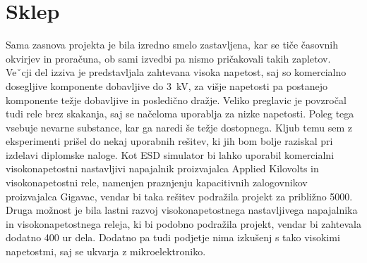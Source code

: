 \documentclass[a4paper,twoside,openright,12pt,Slovene]{book}
\begin{document}
\chapter{Sklep} \label{Sklep}

Sama zasnova projekta je bila izredno smelo zastavljena, kar se tiče časovnih okvirjev in proračuna, ob sami izvedbi pa nismo pričakovali takih zapletov.
~\\Veˇcji del izziva je predstavljala zahtevana visoka napetost, saj so komercialno
dosegljive komponente dobavljive do \SI{3}{\kilo\volt}, za višje napetosti pa postanejo komponente težje dobavljive in posledično dražje. Veliko preglavic je povzročal tudi rele brez skakanja, saj se načeloma uporablja za nizke napetosti. Poleg tega vsebuje nevarne substance, kar ga naredi še težje dostopnega. Kljub temu sem z eksperimenti prišel do nekaj uporabnih rešitev, ki jih bom bolje raziskal pri izdelavi diplomske naloge. Kot ESD simulator bi lahko uporabil komercialni visokonapetostni nastavljivi napajalnik proizvajalca Applied Kilovolts in visokonapetostni rele, namenjen praznjenju kapacitivnih zalogovnikov
proizvajalca Gigavac, vendar bi taka rešitev podražila projekt za približno 5000\texteuro . Druga možnost je bila lastni razvoj visokonapetostnega nastavljivega
napajalnika in visokonapetostnega releja, ki bi podobno podražila projekt, vendar bi zahtevala dodatno 400 ur dela. Dodatno pa tudi podjetje nima izkušenj s tako visokimi napetostmi, saj se ukvarja z mikroelektroniko.


	
 
\end{document}
